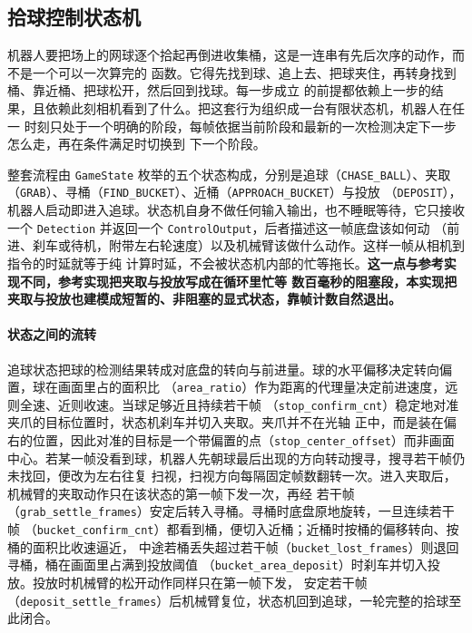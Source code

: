 \subsection{拾球控制状态机}\label{sec:fsm}

机器人要把场上的网球逐个拾起再倒进收集桶，这是一连串有先后次序的动作，而不是一个可以一次算完的
函数。它得先找到球、追上去、把球夹住，再转身找到桶、靠近桶、把球松开，然后回到找球。每一步成立
的前提都依赖上一步的结果，且依赖此刻相机看到了什么。把这套行为组织成一台有限状态机，机器人在任一
时刻只处于一个明确的阶段，每帧依据当前阶段和最新的一次检测决定下一步怎么走，再在条件满足时切换到
下一个阶段。

整套流程由 \texttt{GameState} 枚举的五个状态构成，分别是追球（\texttt{CHASE\_BALL}）、夹取
（\texttt{GRAB}）、寻桶（\texttt{FIND\_BUCKET}）、近桶（\texttt{APPROACH\_BUCKET}）与投放
（\texttt{DEPOSIT}），机器人启动即进入追球。状态机自身不做任何输入输出，也不睡眠等待，它只接收
一个 \texttt{Detection} 并返回一个 \texttt{ControlOutput}，后者描述这一帧底盘该如何动
（前进、刹车或待机，附带左右轮速度）以及机械臂该做什么动作。这样一帧从相机到指令的时延就等于纯
计算时延，不会被状态机内部的忙等拖长。\textbf{这一点与参考实现不同，参考实现把夹取与投放写成在循环里忙等
数百毫秒的阻塞段，本实现把夹取与投放也建模成短暂的、非阻塞的显式状态，靠帧计数自然退出。}


\paragraph{状态之间的流转}
追球状态把球的检测结果转成对底盘的转向与前进量。球的水平偏移决定转向偏置，球在画面里占的面积比
（\texttt{area\_ratio}）作为距离的代理量决定前进速度，远则全速、近则收速。当球足够近且持续若干帧
（\texttt{stop\_confirm\_cnt}）稳定地对准夹爪的目标位置时，状态机刹车并切入夹取。夹爪并不在光轴
正中，而是装在偏右的位置，因此对准的目标是一个带偏置的点（\texttt{stop\_center\_offset}）而非画面
中心。若某一帧没看到球，机器人先朝球最后出现的方向转动搜寻，搜寻若干帧仍未找回，便改为左右往复
扫视，扫视方向每隔固定帧数翻转一次。进入夹取后，机械臂的夹取动作只在该状态的第一帧下发一次，再经
若干帧（\texttt{grab\_settle\_frames}）安定后转入寻桶。寻桶时底盘原地旋转，一旦连续若干帧
（\texttt{bucket\_confirm\_cnt}）都看到桶，便切入近桶；近桶时按桶的偏移转向、按桶的面积比收速逼近，
中途若桶丢失超过若干帧（\texttt{bucket\_lost\_frames}）则退回寻桶，桶在画面里占满到投放阈值
（\texttt{bucket\_area\_deposit}）时刹车并切入投放。投放时机械臂的松开动作同样只在第一帧下发，
安定若干帧（\texttt{deposit\_settle\_frames}）后机械臂复位，状态机回到追球，一轮完整的拾球至此闭合。

